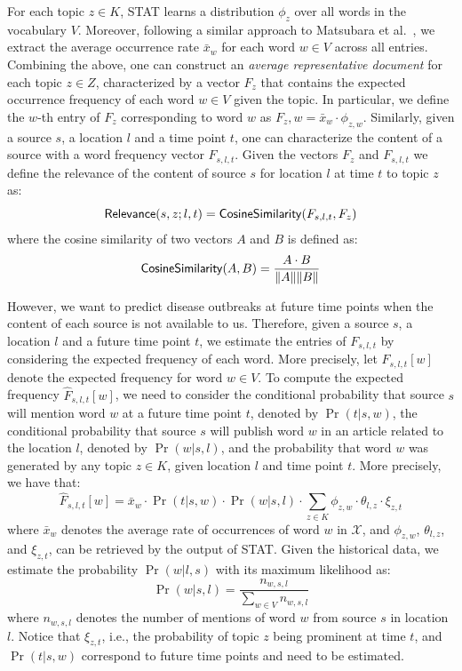 \documentclass[conference]{IEEEtran}
\newcommand{\model}{{STAT}\xspace} %
\begin{document}
For each topic $z \in K$, \model learns a distribution $\phi_z$ over all words in the vocabulary $V$. Moreover, following a similar approach to Matsubara et al.~\cite{matsubara:2012}, we extract the average occurrence rate $\bar{x}_w$ for each word $w \in V$ across all entries. Combining the above, one can construct an {\em average representative document} for each topic $z \in Z$, characterized by a vector $F_z$ that contains the expected occurrence frequency of each word $w \in V$ given the topic. In particular, we define the $w$-th entry of $F_z$ corresponding to word $w$ as $F_z,w = \bar{x}_w \cdot \phi_{z,w}$. Similarly, given a source $s$,  a location $l$ and a time point $t$, one can characterize the content of a source with a word frequency vector $F_{s,l,t}$. Given the vectors $F_z$ and $F_{s,l,t}$ we define the relevance of the content of source $s$ for location $l$ at time $t$ to topic $z$ as:
\begin{equation}
{\sf Relevance}(s,z;l,t) = {\sf CosineSimilarity}(F_{s,l,t},F_z)
\end{equation}
where the cosine similarity of two vectors $A$ and $B$ is defined as:
\[
{\sf CosineSimilarity}(A,B) = \frac{A \cdot B}{\|A\| \|B\|}
\]

However, we want to predict disease outbreaks at future time points when the content of each source is not available to us. 
Therefore, given a source $s$, a location $l$ and a future time point $t$, we estimate 
the entries of $F_{s,l,t}$ by considering the expected frequency of each word. 
More precisely, let $\hat{F}_{s,l,t}[w]$ denote the expected frequency for word 
$w \in V$. To compute the expected frequency $\hat{F}_{s,l,t}[w]$, we need to consider the 
conditional probability that source $s$ will mention word $w$ at a future time point $t$, denoted by $\Pr(t|s,w)$, the 
conditional probability that source $s$ will publish word $w$ in an article related to the location $l$, denoted by $\Pr(w|s,l)$, and 
the probability that word $w$ was generated by any topic $z \in K$, given location $l$ and time point $t$. 
More precisely, we have that:
\begin{equation}
  \hat{F}_{s,l,t}[w] = \bar{x}_{w} \cdot \Pr(t|s,w) \cdot \Pr(w|s,l)\cdot \sum_{z \in K}\phi_{z,w}\cdot \theta_{l,z} \cdot \xi_{z,t}
\end{equation}
where $\bar{x}_{w}$ denotes the average rate of occurrences of word $w$ in $\mathcal{X}$,  and 
$\phi_{z,w}$, $\theta_{l,z}$, and $\xi_{z,t}$, can be retrieved by the output of \model.  Given the historical data, we estimate the probability $\Pr(w|l,s)$ with its maximum likelihood as:
\begin{equation}
  \Pr(w|s,l) = \frac{n_{w,s,l}}{\sum_{w\in V}n_{w,s,l}}
\end{equation}
where $n_{w,s,l}$ denotes the number of mentions of word $w$ from source $s$ in location $l$.
Notice that $\xi_{z,t}$, i.e., the probability of topic $z$ being prominent at time $t$, 
and $\Pr(t|s,w)$ correspond to future time points and need to be estimated.  
\end{document}
